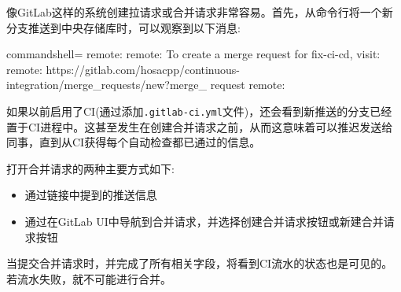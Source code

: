 像GitLab这样的系统创建拉请求或合并请求非常容易。首先，从命令行将一个新分支推送到中央存储库时，可以观察到以下消息:

\begin{tcblisting}{commandshell={}}
remote:
remote: To create a merge request for fix-ci-cd, visit:
remote:
https://gitlab.com/hosacpp/continuous-integration/merge_requests/new?merge_
request%
remote:
\end{tcblisting}

如果以前启用了CI(通过添加\texttt{.gitlab-ci.yml}文件)，还会看到新推送的分支已经置于CI进程中。这甚至发生在创建合并请求之前，从而这意味着可以推迟发送给同事，直到从CI获得每个自动检查都已通过的信息。

打开合并请求的两种主要方式如下:

\begin{itemize}
\item 
通过链接中提到的推送信息

\item 
通过在GitLab UI中导航到合并请求，并选择创建合并请求按钮或新建合并请求按钮
\end{itemize}

当提交合并请求时，并完成了所有相关字段，将看到CI流水的状态也是可见的。若流水失败，就不可能进行合并。

























